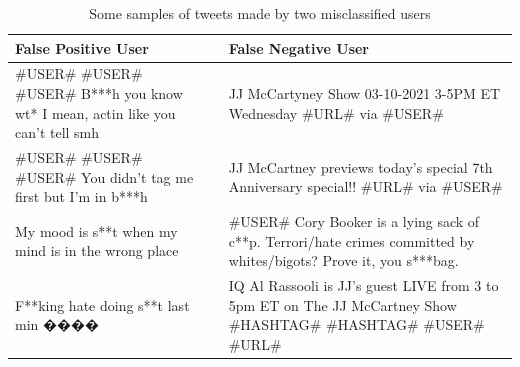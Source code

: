 
\begin{table}[htbp]
\centering
\begin{tabular}{p{7cm}p{1cm}p{7cm}}
\hline
\textbf{False Positive User} &  & \textbf{False Negative User} \\ \hline
\#USER\# \#USER\# \#USER\# B***h you know wt* I mean, actin like you can’t tell smh &  & JJ McCartyney Show 03-10-2021 3-5PM ET Wednesday \#URL\# via \#USER\# \\ \hline
\#USER\# \#USER\# \#USER\# You didn’t tag me first but I’m in b***h &  & JJ McCartney previews today's special 7th Anniversary special!! \#URL\# via \#USER\# \\ \hline
My mood is s**t when my mind is in the wrong place &  & \#USER\# Cory Booker is a lying sack of c**p. Terrori/hate crimes committed by whites/bigots? Prove it, you s***bag. \\ \hline
F**king hate doing s**t last min ���� &  & IQ Al Rassooli is JJ's guest LIVE from 3 to 5pm ET on The JJ McCartney Show \#HASHTAG\# \#HASHTAG\# \#USER\# \#URL\# \\ \hline
\end{tabular}
\caption{Some samples of tweets made by two misclassified users}
\label{tab:err-ana:our_model:examples}
\end{table}


